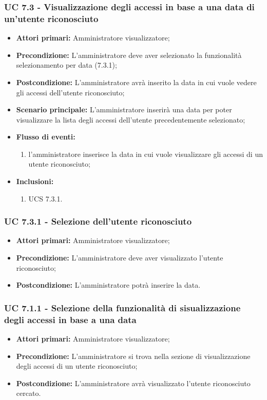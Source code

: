 \subsubsection{UC 7.3 - Visualizzazione degli accessi in base a una data di un'utente riconosciuto}%
\begin{itemize}
	\item \textbf{Attori primari:} Amministratore visualizzatore;
	\item \textbf{Precondizione:} L'amministratore deve aver selezionato la funzionalità selezionamento per data (7.3.1);
	\item \textbf{Postcondizione:} L'amministratore avrà inserito la data in cui vuole vedere gli accessi dell'utente riconosciuto;
	\item \textbf{Scenario principale:} L'amministratore inserirà una data per poter visualizzare la lista degli accessi dell'utente precedentemente selezionato;
	\item \textbf{Flusso di eventi:} 
	\begin{enumerate}
		\item l'amministratore inserisce la data in cui vuole visualizzare gli accessi di un utente riconosciuto;
	\end{enumerate}
	\item \textbf{Inclusioni:}
	\begin{enumerate}
		\item UCS 7.3.1.
	\end{enumerate}
\end{itemize}

\subsubsection{UC 7.3.1 - Selezione dell'utente riconosciuto}%
\begin{itemize}
\item \textbf{Attori primari:} Amministratore visualizzatore;
\item \textbf{Precondizione:} L'amministratore deve aver visualizzato l'utente riconosciuto;
\item \textbf{Postcondizione:} L'amministratore potrà inserire la data.
\end{itemize}

\subsubsection{UC 7.1.1 - Selezione della funzionalità di sisualizzazione degli accessi in base a una data}%
\begin{itemize}
	\item \textbf{Attori primari:} Amministratore visualizzatore;
	\item \textbf{Precondizione:} L'amministratore si trova nella sezione di visualizzazione degli accessi di un utente riconosciuto;
	\item \textbf{Postcondizione:} L'amministratore avrà visualizzato l'utente riconosciuto cercato.
\end{itemize}


